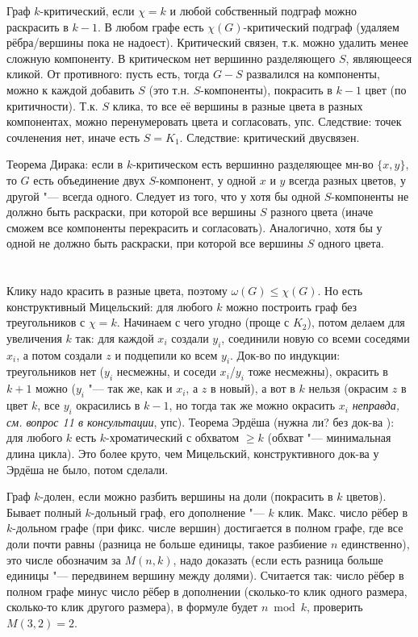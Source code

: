 	Граф $k$-критический, если $\chi=k$ и любой собственный подграф можно раскрасить в $k-1$.
	В любом графе есть $\chi(G)$-критический подграф (удаляем рёбра/вершины пока не надоест).
	Критический связен, т.к. можно удалить менее сложную компоненту.
	В критическом нет вершинно разделяющего $S$, являющееся кликой.
	От противного: пусть есть, тогда $G-S$ развалился на компоненты, можно к каждой добавить $S$ (это т.н. $S$-компоненты), покрасить в $k-1$ цвет (по критичности).
	Т.к. $S$ клика, то все её вершины в разные цвета в разных компонентах, можно перенумеровать цвета и согласовать, упс.
	Следствие: точек сочленения нет, иначе есть $S=K_1$.
	Следствие: критический двусвязен.

	Теорема Дирака: если в $k$-критическом есть вершинно разделяющее мн-во $\{x, y\}$, то
	$G$ есть объединение двух $S$-компонент, у одной $x$ и $y$ всегда разных цветов, у другой "--- всегда одного.
	Следует из того, что у хотя бы одной $S$-компоненты не должно быть раскраски, при которой все вершины $S$ разного цвета
	(иначе сможем все компоненты перекрасить и согласовать).
	Аналогично, хотя бы у одной не должно быть раскраски, при которой все вершины $S$ одного цвета.

\section{} %
	Клику надо красить в разные цвета, поэтому $\omega(G) \le \chi(G)$.
	Но есть конструктивный Мицельский: для любого $k$ можно построить граф без треугольников с $\chi=k$.
	Начинаем с чего угодно (проще с $K_2$), потом делаем для увеличения $k$ так: для каждой $x_i$ создали $y_i$, соединили новую со всеми соседями $x_i$,
	а потом создали $z$ и подцепили ко всем $y_i$.
	Док-во по индукции: треугольников нет ($y_i$ несмежны, и соседи $x_i$/$y_i$ тоже несмежны),
	окрасить в $k+1$ можно ($y_i$ "--- так же, как и $x_i$, а $z$ в новый),
	а вот в $k$ нельзя (окрасим $z$ в цвет $k$, все $y_i$ окрасились в $k-1$, но тогда так же можно окрасить $x_i$ \TODO\textit{неправда, см. вопрос 11 в консультации}, упс).
	Теорема Эрдёша (нужна ли? без док-ва \TODO): для любого $k$ есть $k$-хроматический с обхватом $\ge k$ (обхват "--- минимальная длина цикла).
	Это более круто, чем Мицельский, конструктивного док-ва у Эрдёша не было, потом сделали.

	Граф $k$-долен, если можно разбить вершины на доли (покрасить в $k$ цветов).
	Бывает полный $k$-дольный граф, его дополнение "--- $k$ клик.
	Макс. число рёбер в $k$-дольном графе (при фикс. числе вершин) достигается в полном графе, где все доли почти равны (разница не больше единицы,
	такое разбиение $n$ единственно), это числе обозначим за $M(n, k)$, надо доказать (если есть разница больше единицы "--- передвинем вершину между долями).
	Считается так: число рёбер в полном графе минус число рёбер в дополнении (сколько-то клик одного размера, сколько-то клик другого размера),
	в формуле будет $n \bmod k$, проверить $M(3, 2)=2$.
	
